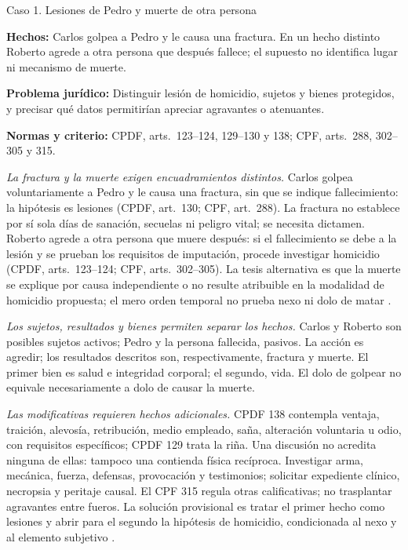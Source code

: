 \documentclass[spanish,letterpaper,oneside]{article}
\newcommand{\fichacaso}[3]{%
	\begin{tcolorbox}[colback=casoverde!5,colframe=casoverde!30,
		boxrule=0.4pt,arc=0.6mm,left=2mm,right=2mm,top=1mm,bottom=1mm]
	\textbf{Hechos:} #1\par
	\textbf{Problema jurídico:} #2\par
	\textbf{Normas y criterio:} #3
	\end{tcolorbox}%
}
\begin{document}
\clearpage
{}
\begin{casoestudio}{Caso 1. Lesiones de Pedro y muerte de otra persona}
\fichacaso{Carlos golpea a Pedro y le causa una fractura. En un hecho distinto Roberto agrede a otra persona que después fallece; el supuesto no identifica lugar ni mecanismo de muerte.}{Distinguir lesión de homicidio, sujetos y bienes protegidos, y precisar qué datos permitirían apreciar agravantes o atenuantes.}{CPDF, arts.~123--124, 129--130 y 138; CPF, arts.~288, 302--305 y 315.}
\textit{La fractura y la muerte exigen encuadramientos distintos.} Carlos golpea voluntariamente a Pedro y le causa una fractura, sin que se indique fallecimiento: la hipótesis es lesiones (CPDF, art.~130; CPF, art.~288). La fractura no establece por sí sola días de sanación, secuelas ni peligro vital; se necesita dictamen. Roberto agrede a otra persona que muere después: si el fallecimiento se debe a la lesión y se prueban los requisitos de imputación, procede investigar homicidio (CPDF, arts.~123--124; CPF, arts.~302--305). La tesis alternativa es que la muerte se explique por causa independiente o no resulte atribuible en la modalidad de homicidio propuesta; el mero orden temporal no prueba nexo ni dolo de matar \citep{cpdfS3Consolidado,cpfOficial2026}.

\textit{Los sujetos, resultados y bienes permiten separar los hechos.} Carlos y Roberto son posibles sujetos activos; Pedro y la persona fallecida, pasivos. La acción es agredir; los resultados descritos son, respectivamente, fractura y muerte. El primer bien es salud e integridad corporal; el segundo, vida. El dolo de golpear no equivale necesariamente a dolo de causar la muerte.

\textit{Las modificativas requieren hechos adicionales.} CPDF 138 contempla ventaja, traición, alevosía, retribución, medio empleado, saña, alteración voluntaria u odio, con requisitos específicos; CPDF 129 trata la riña. Una discusión no acredita ninguna de ellas: tampoco una contienda física recíproca. Investigar arma, mecánica, fuerza, defensas, provocación y testimonios; solicitar expediente clínico, necropsia y peritaje causal. El CPF 315 regula otras calificativas; no trasplantar agravantes entre fueros. La solución provisional es tratar el primer hecho como lesiones y abrir para el segundo la hipótesis de homicidio, condicionada al nexo y al elemento subjetivo \citep{cpdfS3Consolidado,cpfOficial2026}.
\end{casoestudio}
\end{document}
